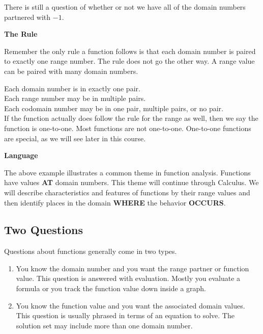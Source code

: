 \documentclass{ximera}
\begin{document}
There is still a question of whether or not we have all of the domain numbers partnered with $-1$. \\


\begin{remark}  \textbf{\textcolor{blue!75!black}{The Rule}} 

Remember the only rule a function follows is that each domain number is paired to exactly one range number.  The rule does not go the other way.  A range value can be paired with many domain numbers.

Each domain number is in exactly one pair. \\
Each range number may be in multiple pairs. \\
Each codomain number may be in one pair, multiple pairs, or no pair. \\


If the function actually does follow the rule for the range as well, then we say the function is one-to-one. Most functions are not one-to-one.  One-to-one functions are special, as we will see later in this course.


\end{remark}




\begin{remark}  \textbf{\textcolor{blue!75!black}{Language}} 

The above example illustrates a common theme in function analysis.  Functions have values \textbf{\textcolor{purple!85!blue}{AT}} domain numbers.  This theme will continue through Calculus.  We will describe characteristics and features of functions by their range values and then identify places in the domain \textbf{\textcolor{purple!85!blue}{WHERE}} the behavior \textbf{\textcolor{purple!85!blue}{OCCURS}}. 


\end{remark}





\subsection*{Two Questions}

Questions about functions generally come in two types.
\begin{enumerate}
\item You know the domain number and you want the range partner or function value.  This question is answered with evaluation. Mostly you evaluate a formula or you track the function value down inside a graph.

\item You know the function value and you want the associated domain values.  This question is usually phrased in terms of an equation to solve.  The solution set may include more than one domain number.
\end{enumerate}
\end{document}
